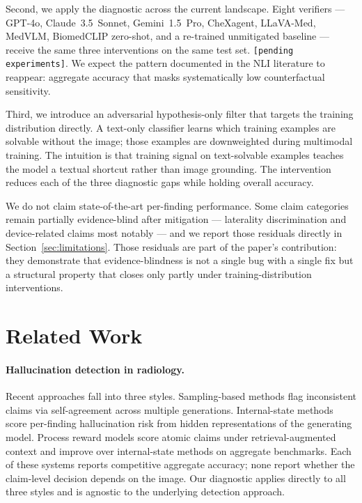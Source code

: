 \documentclass[11pt]{article}
\begin{document}
Second, we apply the diagnostic across the current landscape. Eight verifiers --- GPT-4o, Claude~3.5~Sonnet, Gemini~1.5~Pro, CheXagent, LLaVA-Med, MedVLM, BiomedCLIP zero-shot, and a re-trained unmitigated baseline --- receive the same three interventions on the same test set. \texttt{[pending experiments]}. We expect the pattern documented in the NLI literature to reappear: aggregate accuracy that masks systematically low counterfactual sensitivity.

Third, we introduce an adversarial hypothesis-only filter that targets the training distribution directly. A text-only classifier learns which training examples are solvable without the image; those examples are downweighted during multimodal training. The intuition is that training signal on text-solvable examples teaches the model a textual shortcut rather than image grounding. The intervention reduces each of the three diagnostic gaps while holding overall accuracy.

We do not claim state-of-the-art per-finding performance. Some claim categories remain partially evidence-blind after mitigation --- laterality discrimination and device-related claims most notably --- and we report those residuals directly in Section~\ref{sec:limitations}. Those residuals are part of the paper's contribution: they demonstrate that evidence-blindness is not a single bug with a single fix but a structural property that closes only partly under training-distribution interventions.

\section{Related Work}

\paragraph{Hallucination detection in radiology.} Recent approaches fall into three styles. Sampling-based methods flag inconsistent claims via self-agreement across multiple generations. Internal-state methods score per-finding hallucination risk from hidden representations of the generating model. Process reward models score atomic claims under retrieval-augmented context and improve over internal-state methods on aggregate benchmarks. Each of these systems reports competitive aggregate accuracy; none report whether the claim-level decision depends on the image. Our diagnostic applies directly to all three styles and is agnostic to the underlying detection approach.
\end{document}
